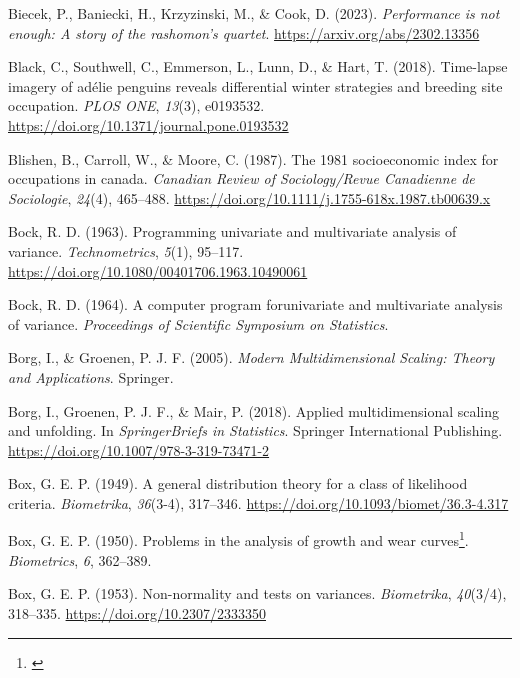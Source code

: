 \documentclass[
  letterpaper,
  10pt,
  krantz2]{krantz}
\newlength{\cslhangindent}
\newenvironment{CSLReferences}[2] %
 {\begin{list}{}{%
  \setlength{\itemindent}{0pt}
  \setlength{\leftmargin}{0pt}
  \setlength{\parsep}{0pt}
  \ifodd #1
   \setlength{\leftmargin}{\cslhangindent}
   \setlength{\itemindent}{-1\cslhangindent}
  \fi
  \setlength{\itemsep}{#2\baselineskip}}}
 {\end{list}}
\providecommand{\href}[2]{#2\footnote{\url{#1}}}
\begin{document}
\begin{CSLReferences}{1}{0}
Biecek, P., Baniecki, H., Krzyzinski, M., \& Cook, D. (2023).
\emph{Performance is not enough: A story of the rashomon's quartet}.
\url{https://arxiv.org/abs/2302.13356}

Black, C., Southwell, C., Emmerson, L., Lunn, D., \& Hart, T. (2018).
Time-lapse imagery of adélie penguins reveals differential winter
strategies and breeding site occupation. \emph{PLOS ONE}, \emph{13}(3),
e0193532. \url{https://doi.org/10.1371/journal.pone.0193532}

Blishen, B., Carroll, W., \& Moore, C. (1987). The 1981 socioeconomic
index for occupations in canada. \emph{Canadian Review of
Sociology/Revue Canadienne de Sociologie}, \emph{24}(4), 465--488.
\url{https://doi.org/10.1111/j.1755-618x.1987.tb00639.x}

Bock, R. D. (1963). Programming univariate and multivariate analysis of
variance. \emph{Technometrics}, \emph{5}(1), 95--117.
\url{https://doi.org/10.1080/00401706.1963.10490061}

Bock, R. D. (1964). A computer program forunivariate and multivariate
analysis of variance. \emph{Proceedings of Scientific Symposium on
Statistics}.

Borg, I., \& Groenen, P. J. F. (2005). \emph{{Modern Multidimensional
Scaling: Theory and Applications}}. Springer.

Borg, I., Groenen, P. J. F., \& Mair, P. (2018). Applied
multidimensional scaling and unfolding. In \emph{SpringerBriefs in
Statistics}. Springer International Publishing.
\url{https://doi.org/10.1007/978-3-319-73471-2}

Box, G. E. P. (1949). A general distribution theory for a class of
likelihood criteria. \emph{Biometrika}, \emph{36}(3-4), 317--346.
\url{https://doi.org/10.1093/biomet/36.3-4.317}

Box, G. E. P. (1950). \href{}{Problems in the analysis of growth and
wear curves}. \emph{Biometrics}, \emph{6}, 362--389.

Box, G. E. P. (1953). Non-normality and tests on variances.
\emph{Biometrika}, \emph{40}(3/4), 318--335.
\url{https://doi.org/10.2307/2333350}


\end{CSLReferences}
\end{document}
